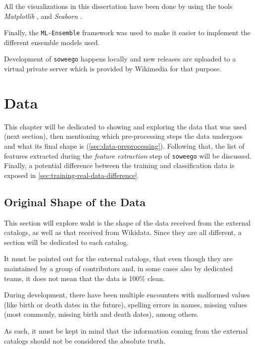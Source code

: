 \documentclass[epsfig,a4paper,11pt,titlepage,twoside,openany]{book}
\begin{document}
All the visualizations in this dissertation have been done by using the tools \textit{Matplotlib} \cite{Hunter_Matplotlib}, and \textit{Seaborn} \cite{Seaborn}.%

Finally, the \texttt{ML-Ensemble} \cite{flennerhag:2017mlens} framework was used to make it easier to implement the different ensemble models used.


Development of \texttt{soweego} happens locally and new releases are uploaded to a virtual private server which is provided by Wikimedia for that purpose. 



\chapter{Data}
\label{chap:data}


This chapter will be dedicated to showing and exploring the data that was used (next section), then mentioning which pre-processing steps the data undergoes and what its final shape is (\autoref{sec:data-preprocessing}). Following that, the list of features extracted during the \textit{feature extraction} step of \texttt{soweego} will be discussed. Finally, a potential difference between the training and classification data is exposed in \autoref{sec:training-real-data-difference}.


\section{Original Shape of the Data}
\label{sec:orig-shape-of-data}

This section will explore waht is the shape of the data received from the external catalogs, as well as that received from Wikidata. Since they are all different, a section will be dedicated to each catalog. 

It must be pointed out for the external catalogs, that even though they are maintained by a group of contributors and, in some cases also by dedicated teams, it does not mean that the data is 100\% clean. 

During development, there have been multiple encounters with malformed values (like birth or death dates in the future), spelling errors in names, missing values (most commonly, missing birth and death dates), among others. 

As such, it must be kept in mind that the information coming from the external catalogs should not be considered the absolute truth.
\end{document}
